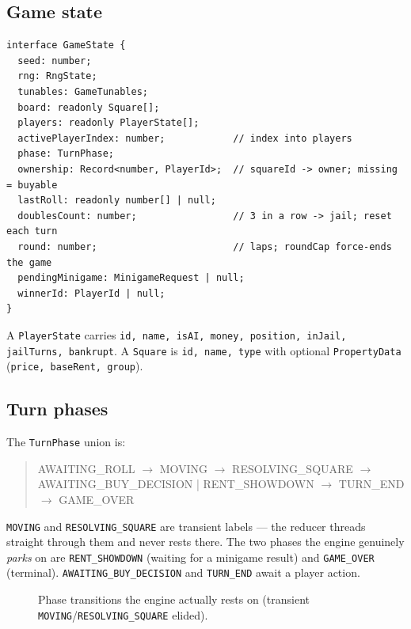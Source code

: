 \documentclass[11pt,a4paper]{article}
\newcommand{\code}[1]{\texttt{#1}}
\begin{document}
\subsection{Game state}
\begin{lstlisting}
interface GameState {
  seed: number;
  rng: RngState;
  tunables: GameTunables;
  board: readonly Square[];
  players: readonly PlayerState[];
  activePlayerIndex: number;            // index into players
  phase: TurnPhase;
  ownership: Record<number, PlayerId>;  // squareId -> owner; missing = buyable
  lastRoll: readonly number[] | null;
  doublesCount: number;                 // 3 in a row -> jail; reset each turn
  round: number;                        // laps; roundCap force-ends the game
  pendingMinigame: MinigameRequest | null;
  winnerId: PlayerId | null;
}
\end{lstlisting}

A \code{PlayerState} carries \code{id, name, isAI, money, position, inJail,
jailTurns, bankrupt}. A \code{Square} is \code{id, name, type} with optional
\code{PropertyData} (\code{price, baseRent, group}).

\subsection{Turn phases}
The \code{TurnPhase} union is:
\begin{quote}\ttfamily\small
AWAITING\_ROLL $\to$ MOVING $\to$ RESOLVING\_SQUARE $\to$\\
AWAITING\_BUY\_DECISION | RENT\_SHOWDOWN $\to$ TURN\_END $\to$ GAME\_OVER
\end{quote}
\code{MOVING} and \code{RESOLVING\_SQUARE} are transient labels --- the reducer
threads straight through them and never rests there. The two phases the engine
genuinely \emph{parks} on are \code{RENT\_SHOWDOWN} (waiting for a minigame
result) and \code{GAME\_OVER} (terminal). \code{AWAITING\_BUY\_DECISION} and
\code{TURN\_END} await a player action.

\begin{figure}[h]
\centering
{}
\caption{Phase transitions the engine actually rests on (transient
\code{MOVING}/\code{RESOLVING\_SQUARE} elided).}
\end{figure}
\end{document}
